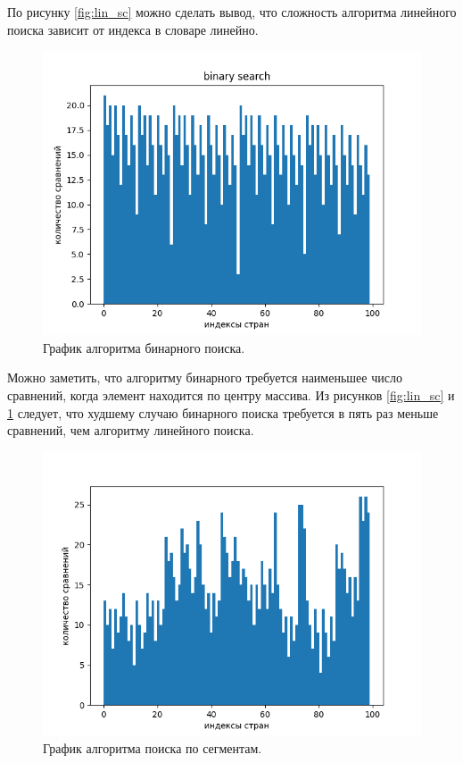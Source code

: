 По рисунку \ref{fig:lin_sc} можно сделать вывод, что сложность алгоритма линейного поиска зависит от индекса в словаре линейно.

\begin{figure}[H]
	\centering
	\includegraphics[scale=0.7]{inc/bin.png}
	\caption{График алгоритма бинарного поиска.}
	\label{fig:bin_sc}
\end{figure}

Можно заметить, что алгоритму бинарного требуется наименьшее число сравнений, когда элемент находится по центру массива. Из рисунков \ref{fig:lin_sc} и \ref{fig:bin_sc} следует, что худшему случаю бинарного поиска требуется в пять раз меньше сравнений, чем алгоритму линейного поиска.

\begin{figure}[H]
	\centering
	\includegraphics[scale=0.7]{inc/seg.png}
	\caption{График алгоритма поиска по сегментам.}
	\label{fig:seg_sc}
\end{figure}

